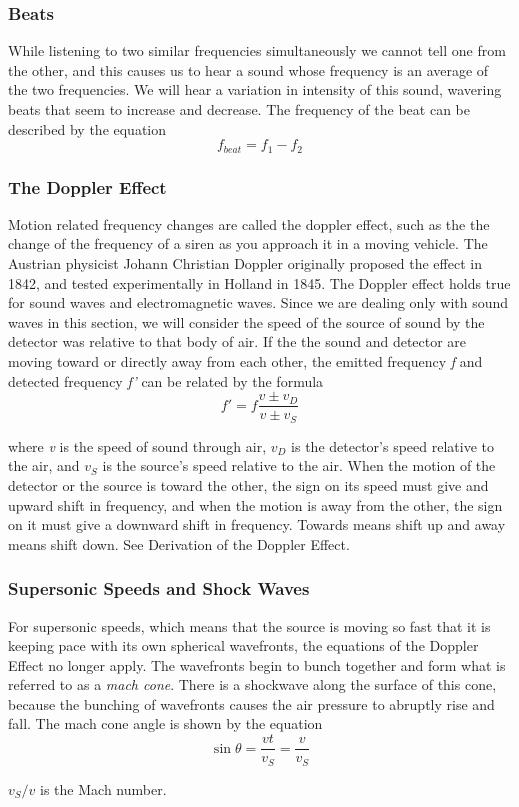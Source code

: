 \documentclass[english]{article}
\begin{document}
\subsubsection*{Beats}

While listening to two similar frequencies simultaneously we cannot
tell one from the other, and this causes us to hear a sound whose
frequency is an average of the two frequencies. We will hear a variation
in intensity of this sound, wavering beats that seem to increase and
decrease. The frequency of the beat can be described by the equation
\[
f_{beat}=f_{1}-f_{2}
\]



\subsubsection*{The Doppler Effect}

Motion related frequency changes are called the doppler effect, such
as the the change of the frequency of a siren as you approach it in
a moving vehicle. The Austrian physicist Johann Christian Doppler
originally proposed the effect in 1842, and tested experimentally
in Holland in 1845. The Doppler effect holds true for sound waves
and electromagnetic waves. Since we are dealing only with sound waves
in this section, we will consider the speed of the source of sound
by the detector was relative to that body of air. If the the sound
and detector are moving toward or directly away from each other, the
emitted frequency \emph{f }and detected frequency \emph{f' }can be
related by the formula
\[
f'=f\frac{v\pm v_{D}}{v\pm v_{S}}
\]


where \emph{v }is the speed of sound through air, $v_{D}$ is the
detector's speed relative to the air, and $v_{S}$ is the source's
speed relative to the air. When the motion of the detector or the
source is toward the other, the sign on its speed must give and upward
shift in frequency, and when the motion is away from the other, the
sign on it must give a downward shift in frequency. Towards means
shift up and away means shift down. See Derivation of the Doppler
Effect.


\subsubsection*{Supersonic Speeds and Shock Waves}

For supersonic speeds, which means that the source is moving so fast
that it is keeping pace with its own spherical wavefronts, the equations
of the Doppler Effect no longer apply. The wavefronts begin to bunch
together and form what is referred to as a \emph{mach cone}. There
is a shockwave along the surface of this cone, because the bunching
of wavefronts causes the air pressure to abruptly rise and fall. The
mach cone angle is shown by the equation
\[
\sin\theta=\frac{vt}{v_{S}}=\frac{v}{v_{S}}
\]


$v_{S}/v$ is the Mach number. 
\end{document}
